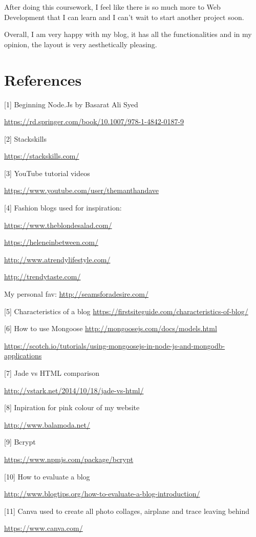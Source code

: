 \documentclass[10pt, a4paper]{article}
\begin{document}
After doing this coursework, I feel like there is so much more to Web Development that I can learn and I can't wait to start another project soon.

Overall, I am very happy with my blog, it has all the functionalities and in my opinion, the layout is very aesthetically pleasing.



	\section{References}

	[1] Beginning Node.Js by Basarat Ali Syed

	\url{https://rd.springer.com/book/10.1007/978-1-4842-0187-9}

	[2] Stackskills

	\url{https://stackskills.com/}

	[3] YouTube tutorial videos

	\url{https://www.youtube.com/user/themanthandave}

	[4] Fashion blogs used for inspiration:

	\url{https://www.theblondesalad.com/}

	\url{https://heleneinbetween.com/}

	\url{http://www.atrendylifestyle.com/}

	\url{http://trendytaste.com/}

	My personal fav:
	\url{http://seamsforadesire.com/}

	[5] Characteristics of a blog
	\url{https://firstsiteguide.com/characteristics-of-blog/}

	[6] How to use Mongoose
	\url{http://mongoosejs.com/docs/models.html}

	\url{https://scotch.io/tutorials/using-mongoosejs-in-node-js-and-mongodb-applications}

	[7] Jade vs HTML comparison

	\url{http://vstark.net/2014/10/18/jade-vs-html/}

	[8] Inpiration for pink colour of my website

	\url{http://www.balamoda.net/}

	[9] Bcrypt

	\url{https://www.npmjs.com/package/bcrypt}

	[10] How to evaluate a blog

	\url{http://www.blogtips.org/how-to-evaluate-a-blog-introduction/}

	[11] Canva used to create all photo collages, airplane and trace leaving behind

	\url{https://www.canva.com/}
\end{document}
